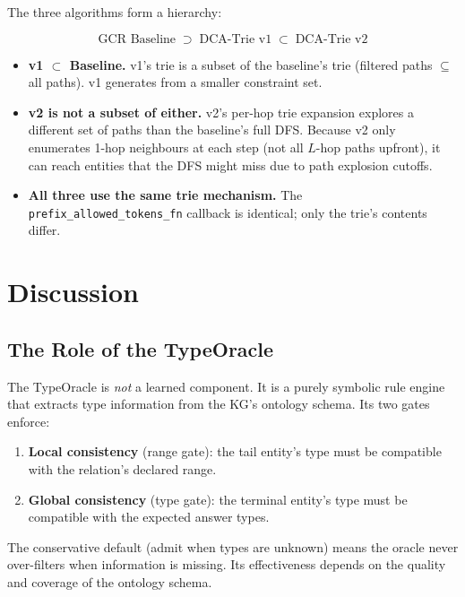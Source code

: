 \documentclass[11pt,a4paper]{article}
\begin{document}
The three algorithms form a hierarchy:

\[
  \text{GCR Baseline} \;\supset\; \text{DCA-Trie v1} \;\subset\;
  \text{DCA-Trie v2}
\]

\begin{itemize}
  \item \textbf{v1 $\subset$ Baseline.}  v1's trie is a subset of the
    baseline's trie (filtered paths $\subseteq$ all paths).  v1
    generates from a smaller constraint set.
  \item \textbf{v2 is not a subset of either.}  v2's per-hop trie
    expansion explores a different set of paths than the baseline's
    full DFS.  Because v2 only enumerates 1-hop neighbours at each
    step (not all $L$-hop paths upfront), it can reach entities that
    the DFS might miss due to path explosion cutoffs.
  \item \textbf{All three use the same trie mechanism.}  The
    \texttt{prefix\_allowed\_tokens\_fn} callback is identical; only
    the trie's contents differ.
\end{itemize}

\section{Discussion}

\subsection{The Role of the TypeOracle}

The TypeOracle is \emph{not} a learned component.  It is a purely
symbolic rule engine that extracts type information from the KG's
ontology schema.  Its two gates enforce:

\begin{enumerate}
  \item \textbf{Local consistency} (range gate): the tail entity's type
    must be compatible with the relation's declared range.
  \item \textbf{Global consistency} (type gate): the terminal entity's
    type must be compatible with the expected answer types.
\end{enumerate}

The conservative default (admit when types are unknown) means the
oracle never over-filters when information is missing.  Its effectiveness
depends on the quality and coverage of the ontology schema.
\end{document}
